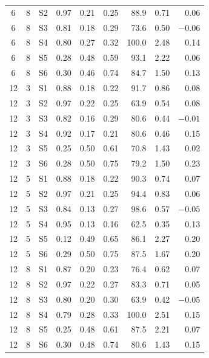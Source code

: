 \begin{table}[H]
\begin{tabular}{c|c|c|r|r|r|r|r|r}
    6  & 8 & S2 & 0.97 & 0.21 & 0.25 & 88.9 & 0.71 & 0.06 \\
    6  & 8 & S3 & 0.81 & 0.18 & 0.29 & 73.6 & 0.50 & $-0.06$ \\
    6  & 8 & S4 & 0.80 & 0.27 & 0.32 & 100.0 & 2.48 & 0.14 \\
    6  & 8 & S5 & 0.28 & 0.48 & 0.59 & 93.1 & 2.22 & 0.06 \\
    6  & 8 & S6 & 0.30 & 0.46 & 0.74 & 84.7 & 1.50 & 0.13 \\
    12 & 3 & S1 & 0.88 & 0.18 & 0.22 & 91.7 & 0.86 & 0.08 \\
    12 & 3 & S2 & 0.97 & 0.22 & 0.25 & 63.9 & 0.54 & 0.08 \\
    12 & 3 & S3 & 0.82 & 0.16 & 0.29 & 80.6 & 0.44 & $-0.01$ \\
    12 & 3 & S4 & 0.92 & 0.17 & 0.21 & 80.6 & 0.46 & 0.15 \\
    12 & 3 & S5 & 0.25 & 0.50 & 0.61 & 70.8 & 1.43 & 0.02 \\
    12 & 3 & S6 & 0.28 & 0.50 & 0.75 & 79.2 & 1.50 & 0.23 \\
    12 & 5 & S1 & 0.88 & 0.18 & 0.22 & 90.3 & 0.74 & 0.07 \\
    12 & 5 & S2 & 0.97 & 0.21 & 0.25 & 94.4 & 0.83 & 0.06 \\
    12 & 5 & S3 & 0.84 & 0.13 & 0.27 & 98.6 & 0.57 & $-0.05$ \\
    12 & 5 & S4 & 0.95 & 0.13 & 0.16 & 62.5 & 0.35 & 0.13 \\
    12 & 5 & S5 & 0.12 & 0.49 & 0.65 & 86.1 & 2.27 & 0.20 \\
    12 & 5 & S6 & 0.29 & 0.50 & 0.75 & 87.5 & 1.67 & 0.20 \\
    12 & 8 & S1 & 0.87 & 0.20 & 0.23 & 76.4 & 0.62 & 0.07 \\
    12 & 8 & S2 & 0.97 & 0.22 & 0.27 & 83.3 & 0.71 & 0.05 \\
    12 & 8 & S3 & 0.80 & 0.20 & 0.30 & 63.9 & 0.42 & $-0.05$ \\
    12 & 8 & S4 & 0.79 & 0.28 & 0.33 & 100.0 & 2.51 & 0.15 \\
    12 & 8 & S5 & 0.25 & 0.48 & 0.61 & 87.5 & 2.21 & 0.07 \\
    12 & 8 & S6 & 0.30 & 0.48 & 0.74 & 80.6 & 1.43 & 0.15 \\
    \bottomrule
  \end{tabular}
\end{table}


